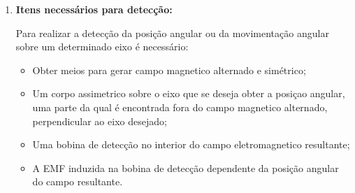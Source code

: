 \begin{enumerate}
\begin{itemize}
  \end{itemize}

  \item \textbf{Itens necessários para detecção:}

  Para realizar a detecção da posição angular ou da movimentação angular sobre um determinado eixo é necessário:

  \begin{itemize}
    \item Obter meios para gerar campo magnetico alternado e simétrico;

    \item Um corpo assimetrico sobre o eixo que se deseja obter a posiçao angular, uma parte da qual é encontrada fora do campo magnetico alternado, perpendicular ao eixo desejado;

    \item Uma bobina de detecção no interior do campo eletromagnetico resultante;

    \item A EMF induzida na bobina de detecção dependente da posição angular do campo resultante.

  \end{itemize}


\end{enumerate}
